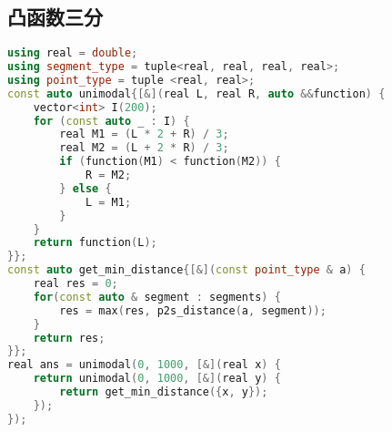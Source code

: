 \subsection{凸函数三分}
\begin{lstlisting}[language=c++]
using real = double;
using segment_type = tuple<real, real, real, real>;
using point_type = tuple <real, real>;
const auto unimodal{[&](real L, real R, auto &&function) {
    vector<int> I(200);
    for (const auto _ : I) {
        real M1 = (L * 2 + R) / 3;
        real M2 = (L + 2 * R) / 3;
        if (function(M1) < function(M2)) {
            R = M2;
        } else {
            L = M1;
        }
    }
    return function(L);
}};
const auto get_min_distance{[&](const point_type & a) {
    real res = 0;
    for(const auto & segment : segments) {
        res = max(res, p2s_distance(a, segment));
    }
    return res;
}};
real ans = unimodal(0, 1000, [&](real x) {
    return unimodal(0, 1000, [&](real y) {
        return get_min_distance({x, y});
    });
});
\end{lstlisting}